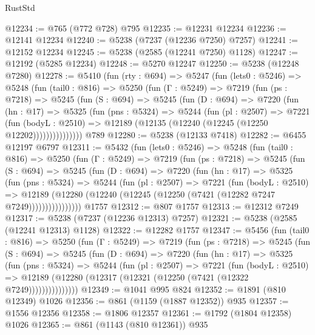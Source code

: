 \begin{lexlean}{RustStd}
\begin{coremodule}
@12234 := @765 (@772 @728) @795
@12235 := @12231 @12234
@12236 := @12141 @12234
@12240 := @5238 (@7237 (@12236 @7250) @7257)
@12241 := @12152 @12234
@12245 := @5238 (@2585 (@12241 @7250) @1128)
@12247 := @12192 (@5285 @12234)
@12248 := @5270 @12247
@12250 := @5238 (@12248 @7280)
@12278 := @5410
    (fun (rty : @694) =>
    @5247
      (fun (lets0 : @5246) =>
      @5248
        (fun (tail0 : @816) =>
        @5250
          (fun (Γ : @5249) =>
          @7219
            (fun (ps : @7218) =>
            @5245
              (fun (S : @694) =>
              @5245
                (fun (D : @694) =>
                @7220
                  (fun (hn : @17) =>
                  @5325
                    (fun (pns : @5324) =>
                    @5244
                      (fun (pl : @2507) =>
                      @7221
                        (fun (bodyL : @2510) =>
                        @12189 (@12135 (@12240 (@12245 (@12250 @12202)))))))))))))))
    @789
@12280 := @5238 (@12133 @7418)
@12282 := @6455 @12197 @6797
@12311 := @5432
    (fun (lets0 : @5246) =>
    @5248
      (fun (tail0 : @816) =>
      @5250
        (fun (Γ : @5249) =>
        @7219
          (fun (ps : @7218) =>
          @5245
            (fun (S : @694) =>
            @5245
              (fun (D : @694) =>
              @7220
                (fun (hn : @17) =>
                @5325
                  (fun (pns : @5324) =>
                  @5244
                    (fun (pl : @2507) =>
                    @7221
                      (fun (bodyL : @2510) =>
                      @12189
                        (@12280 (@12240 (@12245 (@12250 (@7421 (@12282 @7247 @7249))))))))))))))))
    @1757
@12312 := @807 @1757
@12313 := @12312 @7249
@12317 := @5238 (@7237 (@12236 @12313) @7257)
@12321 := @5238 (@2585 (@12241 @12313) @1128)
@12322 := @12282 @1757
@12347 := @5456
    (fun (tail0 : @816) =>
    @5250
      (fun (Γ : @5249) =>
      @7219
        (fun (ps : @7218) =>
        @5245
          (fun (S : @694) =>
          @5245
            (fun (D : @694) =>
            @7220
              (fun (hn : @17) =>
              @5325
                (fun (pns : @5324) =>
                @5244
                  (fun (pl : @2507) =>
                  @7221
                    (fun (bodyL : @2510) =>
                    @12189 (@12280 (@12317 (@12321 (@12250 (@7421 (@12322 @7249)))))))))))))))
@12349 := @1041 @995 @824
@12352 := @1891 (@810 @12349) @1026
@12356 := @861 (@1159 (@1887 @12352)) @935
@12357 := @1556 @12356
@12358 := @1806 @12357
@12361 := @1792 (@1804 @12358) @1026
@12365 := @861 (@1143 (@810 @12361)) @935

\end{coremodule}
\end{lexlean}
